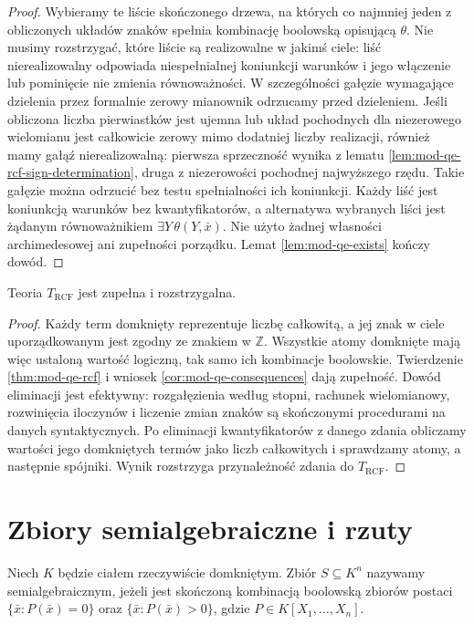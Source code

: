 \begin{proof}
Wybieramy te liście skończonego drzewa, na których
co najmniej jeden z obliczonych układów znaków
spełnia kombinację boolowską opisującą $\theta$.
Nie musimy rozstrzygać, które liście są realizowalne
w jakimś ciele: liść nierealizowalny odpowiada
niespełnialnej koniunkcji warunków i jego włączenie
lub pominięcie nie zmienia równoważności.
W szczególności gałęzie wymagające dzielenia przez
formalnie zerowy mianownik odrzucamy przed dzieleniem.
Jeśli obliczona liczba pierwiastków jest ujemna lub
układ pochodnych dla niezerowego wielomianu jest
całkowicie zerowy mimo dodatniej liczby realizacji,
również mamy gałąź nierealizowalną: pierwsza
sprzeczność wynika z lematu
\ref{lem:mod-qe-rcf-sign-determination}, druga z
niezerowości pochodnej najwyższego rzędu.
Takie gałęzie można odrzucić bez testu spełnialności
ich koniunkcji.
Każdy liść jest koniunkcją warunków bez kwantyfikatorów,
a alternatywa wybranych liści jest żądanym równoważnikiem
$\exists Y\,\theta(Y,\bar x)$. Nie użyto żadnej
własności archimedesowej ani zupełności porządku.
Lemat \ref{lem:mod-qe-exists} kończy dowód.
\end{proof}

\begin{wniosek}
\label{cor:mod-qe-rcf-complete}
Teoria $T_{\mathrm{RCF}}$ jest zupełna i rozstrzygalna.
\end{wniosek}
\begin{proof}
Każdy term domknięty reprezentuje liczbę całkowitą,
a jej znak w ciele uporządkowanym jest zgodny ze
znakiem w $\mathbb Z$. Wszystkie atomy domknięte
mają więc ustaloną wartość logiczną, tak samo ich
kombinacje boolowskie. Twierdzenie \ref{thm:mod-qe-rcf}
i wniosek \ref{cor:mod-qe-consequences} dają zupełność.
Dowód eliminacji jest efektywny: rozgałęzienia według
stopni, rachunek wielomianowy, rozwinięcia iloczynów
i liczenie zmian znaków są skończonymi procedurami
na danych syntaktycznych. Po eliminacji kwantyfikatorów
z danego zdania obliczamy wartości jego domkniętych
termów jako liczb całkowitych i sprawdzamy atomy,
a następnie spójniki. Wynik rozstrzyga przynależność
zdania do $T_{\mathrm{RCF}}$.
\end{proof}

\section{Zbiory semialgebraiczne i rzuty}
\begin{definicja}
\label{def:mod-qe-semialgebraic}
Niech $K$ będzie ciałem rzeczywiście domkniętym.
Zbiór $S\subseteq K^n$ nazywamy semialgebraicznym,
jeżeli jest skończoną kombinacją boolowską zbiorów
postaci $\{\bar x:P(\bar x)=0\}$ oraz
$\{\bar x:P(\bar x)>0\}$, gdzie $P\in K[X_1,\ldots,X_n]$.
\end{definicja}

